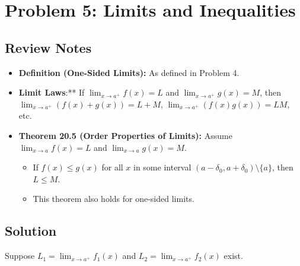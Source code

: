 \documentclass{article}
\begin{document}
\section*{Problem 5: Limits and Inequalities}

\subsection*{Review Notes}

\begin{itemize}
    \item \textbf{Definition (One-Sided Limits):} As defined in Problem 4.
    \item \textbf{Limit Laws}:** If \(\lim_{x\to a^+} f(x) = L\) and \(\lim_{x\to a^+} g(x) = M\), then \(\lim_{x\to a^+} (f(x)+g(x)) = L+M\), \(\lim_{x\to a^+} (f(x)g(x)) = LM\), etc.
    \item \textbf{Theorem 20.5 (Order Properties of Limits):} Assume \(\lim_{x\to a} f(x) = L\) and \(\lim_{x\to a} g(x) = M\).
        \begin{itemize}
            \item If \(f(x) \le g(x)\) for all \(x\) in some interval \((a-\delta_0, a+\delta_0) \setminus \{a\}\), then \(L \le M\).
            \item This theorem also holds for one-sided limits.
        \end{itemize}
\end{itemize}

\subsection*{Solution}

Suppose \(L_1 = \lim_{x\to a^+} f_1(x)\) and \(L_2 = \lim_{x\to a^+} f_2(x)\) exist.
\end{document}
